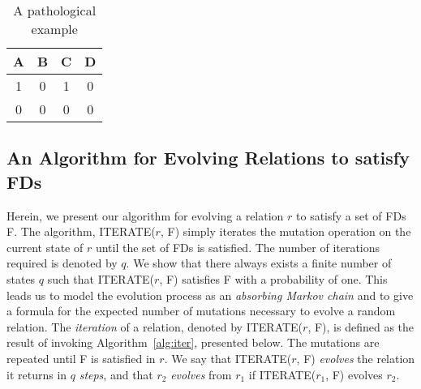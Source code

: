 {\line
\begin{table}[ht]
\begin{center}
\begin{tabular}{|c|c|c|c|} \hline
A & B & C & D \\ \hline
1 & 0 & 1 & 0 \\
0 & 0 & 0 & 0 \\ \hline
\end{tabular}
\end{center}
\caption{\label{tbl17} A pathological example}
\end{table}
}
\medskip


\subsection{An Algorithm for Evolving Relations to satisfy FDs}
\label{sec:evolve}


Herein, we present our algorithm for evolving a relation $r$ to satisfy a set
of FDs F. The algorithm, ITERATE($r$, F) simply iterates 
the mutation operation on the current state of $r$ until the set of
FDs is satisfied. The number of iterations required is denoted by $q$.
We show that there always exists a finite number of states $q$
such that ITERATE($r$, F) satisfies F with a probability of one.
This leads us to model the evolution process as an 
{\em absorbing Markov chain} \cite{ks60} and to give a 
formula for the expected number of mutations necessary to
evolve a random relation.
The {\em iteration} of a relation, denoted by ITERATE($r$, F),
is defined as the result of invoking Algorithm~\ref{alg:iter},
presented below. The mutations are repeated until F is satisfied in $r$.
We say that ITERATE($r$, F) {\em evolves} the relation it returns
in $q$ {\em steps}, and that $r_2$ {\em evolves} from $r_1$
if ITERATE($r_1$, F) evolves $r_2$.


